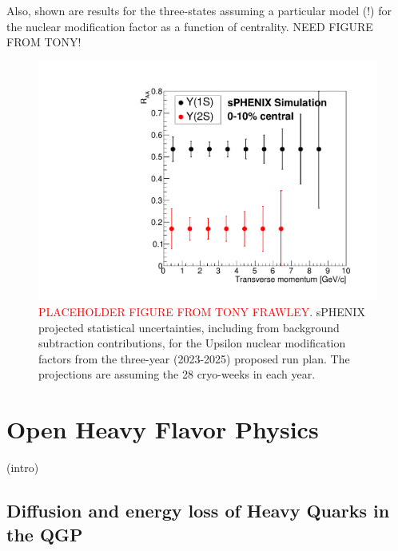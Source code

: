Also, shown are results for the three-states assuming a particular model (!) for the nuclear modification factor as a function of centrality.   NEED FIGURE FROM TONY!

\begin{figure}
    \centering
    \includegraphics[width=0.55\linewidth]{figs/BUP_Upsilon_RAA_3yr_28wks.pdf}
    \caption{{\textcolor{red}{PLACEHOLDER FIGURE FROM TONY FRAWLEY}}. sPHENIX projected statistical uncertainties, including from background subtraction contributions, for the Upsilon nuclear modification factors from the three-year (2023-2025) proposed run plan.   The projections are assuming the 28 cryo-weeks in each year.
    \label{fig:upsilon3years}}
\end{figure}

\section{Open Heavy Flavor Physics}
\label{sec:HF}

(intro)

\subsection{Diffusion and energy loss of Heavy Quarks in the QGP}


